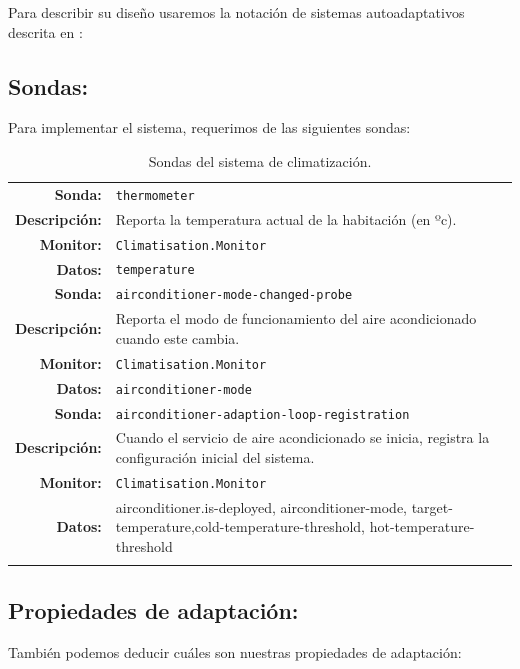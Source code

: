 Para describir su diseño usaremos la notación de sistemas autoadaptativos descrita en \cite{fonsEspecificacionSistemasAutoadaptativos2021}:

\subsection{Sondas:}

Para implementar el sistema, requerimos de las siguientes sondas:

\begin{longtable}{|r p{11.5cm}|}
    \hline
    \textbf{Sonda:} & \texttt{thermometer}  \\
    \textbf{Descripción:} & Reporta la temperatura actual de la habitación (en ºc). \\
    \textbf{Monitor:} & \texttt{Climatisation.Monitor} \\
    \textbf{Datos:} & \texttt{temperature} \\
    \hline
    \textbf{Sonda:} & \texttt{airconditioner-mode-changed-probe}  \\
    \textbf{Descripción:} & Reporta el modo de funcionamiento del aire acondicionado cuando este cambia. \\
    \textbf{Monitor:} & \texttt{Climatisation.Monitor} \\
    \textbf{Datos:} & \texttt{airconditioner-mode} \\
    \hline
    \textbf{Sonda:} & \texttt{airconditioner-adaption-loop-registration}  \\
    \textbf{Descripción:} & Cuando el servicio de aire acondicionado se inicia, registra la configuración inicial del sistema. \\
    \textbf{Monitor:} & \texttt{Climatisation.Monitor} \\
    \textbf{Datos:} &  \ttfamily\selectfont airconditioner.is-deployed, airconditioner-mode, target-temperature,cold-temperature-threshold, hot-temperature-threshold \\
    \hline

    \caption{Sondas del sistema de climatización.}
    \label{tab:climatisation-probes}
\end{longtable}

\subsection{Propiedades de adaptación:}

También podemos deducir cuáles son nuestras propiedades de adaptación:

